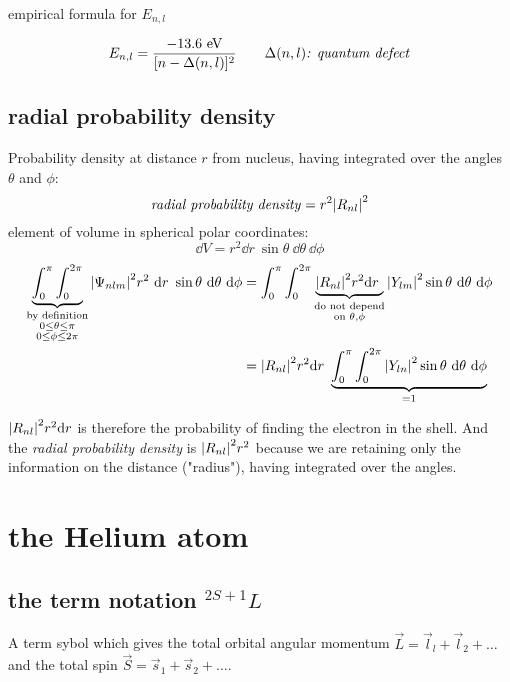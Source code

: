 \documentclass[10pt, a4paper, twocolumn]{article}
\newcommand{\n}{\par \noindent}
\begin{document}
\n empirical formula for $E_{n,l}$

\[ E_{n,l} = \frac{-13.6 \text{ eV}}
{[n- \Delta (n,l)]^2}
\qquad \Delta (n,l) \text{\emph{: quantum defect}} \]

\subsection{radial probability density}

Probability density at distance $r$ from nucleus, having integrated over the angles $\theta$ and $\phi$:
\[\text{\emph{radial probability density}}
= r^2 \abs{R_{nl}}^2 \]
element of volume in spherical polar coordinates:
\[\dd V = r^2 \dd r\ \sin \theta \ \dd \theta \ \dd \phi
\]
\begin{equation*}
\begin{aligned}
\underbrace{\int _0^\pi \int _0^{2\pi}}
_{\substack{\text{by definition}\\ 0 \leq \theta \leq \pi
\\ 0 \leq \phi \leq 2 \pi}}
\abs{\Psi _{nlm}}^2 r^2 \ \dd r
\ \sin \theta \ \dd \theta \ \dd \phi &=
\int _0^\pi \int _0^{2\pi}
\underbrace{\abs{R_{nl}}^2 r^2 \dd r\ }
_{\substack{\text{do not depend}
\\ {\text{on } \theta, \phi}}}
\abs{Y_{lm}}^2 \sin \theta \ \dd \theta \ \dd \phi
\\ &= \abs{R_{nl}}^2 r^2 \dd r\ 
\underbrace{\int _0^\pi \int _0^{2\pi} \abs{Y_{ln}}^2
\sin \theta \ \dd \theta \ \dd \phi}_{=1}
\end{aligned}
\end{equation*}

$\abs{R_{nl}}^2r^2\dd r$ is therefore the probability of finding the electron in the shell. And the \emph{radial probability density} is $\abs{R_{nl}}^2r^2$ because we are retaining only the information on the distance ("radius"), having integrated over the angles.

\section{the Helium atom}

\subsection{the term notation $^{2S+1}L$}

A term sybol which gives the total orbital angular momentum $\vec L = \vec l _l + \vec l _2 + \ldots$ and the total spin $\vec S = \vec s_1 + \vec s_2 + \ldots $.
\end{document}
